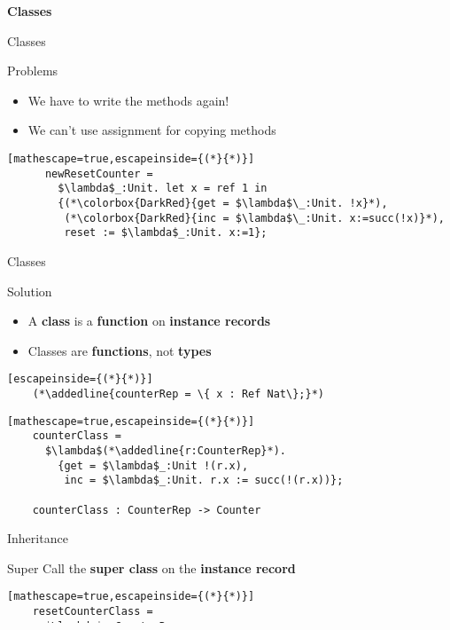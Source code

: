 \documentclass[presentation,xcolor=svgnames]{beamer}
\newcommand{\sectionframe}[1]{
  \begin{frame}
    \centering
    \huge \textbf{#1}
  \end{frame}
}
\begin{document}
\sectionframe{Classes}

\begin{frame}[fragile]{Classes}
  \begin{block}{Problems}
    \begin{itemize}
    \item We have to write the methods again!
    \item We can't use assignment for copying methods
    \end{itemize}
    \begin{lstlisting}[mathescape=true,escapeinside={(*}{*)}]
      newResetCounter =
        $\lambda$_:Unit. let x = ref 1 in
        {(*\colorbox{DarkRed}{get = $\lambda$\_:Unit. !x}*),
         (*\colorbox{DarkRed}{inc = $\lambda$\_:Unit. x:=succ(!x)}*),
         reset := $\lambda$_:Unit. x:=1};
    \end{lstlisting}
  \end{block}
\end{frame}

\begin{frame}[fragile]{Classes}
  \begin{block}{Solution}
    \begin{itemize}
    \item A \textbf{class} is a \textbf{function} on \textbf{instance records}
    \item Classes are \textbf{functions}, not \textbf{types}
    \end{itemize}
  \end{block}
  \begin{lstlisting}[escapeinside={(*}{*)}]
    (*\addedline{counterRep = \{ x : Ref Nat\};}*)
  \end{lstlisting}
  \begin{lstlisting}[mathescape=true,escapeinside={(*}{*)}]
    counterClass =
      $\lambda$(*\addedline{r:CounterRep}*).
        {get = $\lambda$_:Unit !(r.x),
         inc = $\lambda$_:Unit. r.x := succ(!(r.x))};

    counterClass : CounterRep -> Counter
  \end{lstlisting}
\end{frame}

\begin{frame}[fragile]{Inheritance}
  \begin{block}{Super}
  Call the \textbf{super class} on the \textbf{instance record}
  \begin{lstlisting}[mathescape=true,escapeinside={(*}{*)}]
    resetCounterClass =
      $\lambda$r:CounterRep.
      (*\addedline{let super = counterClass r in}*)
        {get=(*\addedline{super.get}*),
         inc=(*\addedline{super.inc}*),
         (*\addedline{reset = $\lambda$\_:Unit. r.x := 1\}}*)
  \end{lstlisting}

  \begin{block}{}
  \texttt{reset} and \texttt{super.get} use the same \texttt{r.x}!
  \end{block}
  \end{block}
\end{frame}
\end{document}
